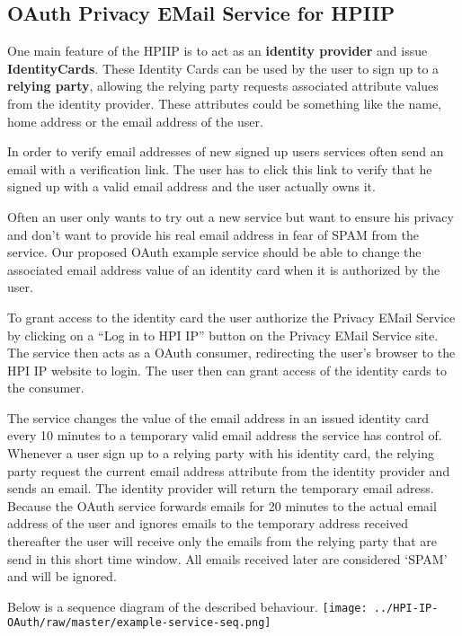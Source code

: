 \subsection{OAuth Privacy EMail Service for HPIIP}

One main feature of the HPIIP is to act as an
\textbf{identity provider} and issue \textbf{IdentityCards}. These
Identity Cards can be used by the user to sign up to a
\textbf{relying party}, allowing the relying party requests
associated attribute values from the identity provider. These
attributes could be something like the name, home address or the
email address of the user.

In order to verify email addresses of new signed up users services
often send an email with a verification link. The user has to click
this link to verify that he signed up with a valid email address
and the user actually owns it.

Often an user only wants to try out a new service but want to
ensure his privacy and don't want to provide his real email address
in fear of SPAM from the service. Our proposed OAuth example
service should be able to change the associated email address value
of an identity card when it is authorized by the user.

To grant access to the identity card the user authorize the Privacy
EMail Service by clicking on a ``Log in to HPI IP'' button on the
Privacy EMail Service site. The service then acts as a OAuth
consumer, redirecting the user's browser to the HPI IP website to
login. The user then can grant access of the identity cards to the
consumer.

The service changes the value of the email address in an issued
identity card every 10 minutes to a temporary valid email address
the service has control of. Whenever a user sign up to a relying
party with his identity card, the relying party request the current
email address attribute from the identity provider and sends an
email. The identity provider will return the temporary email
adress. Because the OAuth service forwards emails for 20 minutes to
the actual email address of the user and ignores emails to the
temporary address received thereafter the user will receive only
the emails from the relying party that are send in this short time
window. All emails received later are considered `SPAM' and will be
ignored.

Below is a sequence diagram of the described behaviour.
\texttt{[image: ../HPI-IP-OAuth/raw/master/example-service-seq.png]}

